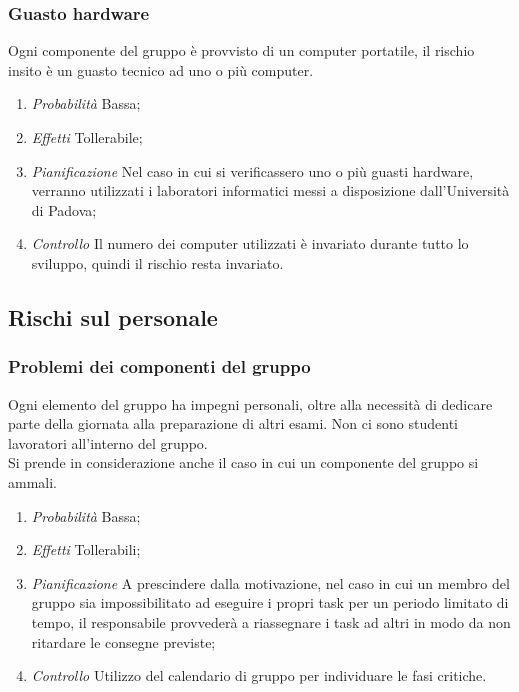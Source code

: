 		\subsubsection{Guasto hardware}
		
Ogni componente del gruppo è provvisto di un computer portatile, il rischio insito è un guasto tecnico ad uno o più computer.
\begin{enumerate}
\item \textit{Probabilità} Bassa;
\item \textit{Effetti} Tollerabile;
\item \textit{Pianificazione} Nel caso in cui si verificassero uno o più guasti hardware, verranno utilizzati i laboratori informatici messi a disposizione dall'Università di Padova;
\item \textit{Controllo} Il numero dei computer utilizzati è invariato durante tutto lo sviluppo, quindi il rischio resta invariato.
\end{enumerate}	
	
	
	\subsection{Rischi sul personale}
		\subsubsection{Problemi dei componenti del gruppo}
		
Ogni elemento del gruppo ha impegni personali, oltre alla necessità di dedicare parte della giornata alla preparazione di altri esami. Non ci sono studenti lavoratori all'interno del gruppo. \\
Si prende in considerazione anche il caso in cui un componente del gruppo si ammali. 		
\begin{enumerate}
\item \textit{Probabilità} Bassa;
\item \textit{Effetti} Tollerabili;
\item \textit{Pianificazione} A prescindere dalla motivazione, nel caso in cui un membro del gruppo sia impossibilitato ad eseguire i propri task per un periodo limitato di tempo, il responsabile provvederà a riassegnare i task ad altri in modo da non ritardare le consegne previste;
\item \textit{Controllo} Utilizzo del calendario di gruppo per individuare le fasi critiche.
\end{enumerate}

